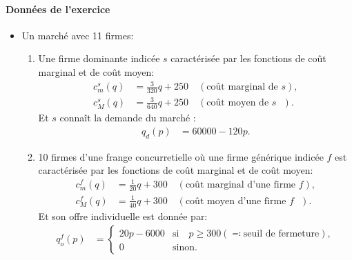 \documentclass[notes, ignorenonframetext, compress, 9pt, xcolor=svgnames, aspectratio=169]{beamer}
\begin{document}
\begin{frame}
  [allowframebreaks]{\insertsection}
  \framesubtitle{Données de l'exercice}
  \begin{itemize}
\item Un marché avec 11 firmes:
\begin{enumerate}[$\cdot$]
\item Une firme dominante indicée $s$ caractérisée par les fonctions de coût marginal et de coût moyen:
\begin{align}
c_m^s(q) &= \frac{3}{320}q + 250 \quad (\text{coût marginal de $s$}) \label{eq1},\\
c_M^s(q) &= \frac{3}{640}q + 250 \quad (\text{coût moyen de $s$ })\label{eq2}.
\end{align}
Et $s$ connaît la demande du marché :
\begin{align}
q_d(p) &= 60000 - 120p.\label{eq3}
\end{align}
\item 10 firmes d'une frange concurretielle où une firme générique indicée $f$ est caractérisée par les fonctions de coût marginal et de coût moyen:
\begin{align}
c_m^f (q)&= \frac{1}{20}q + 300 \quad (\text{coût marginal d'une firme $f$}) \label{eq4},\\
c_M^f(q) &= \frac{1}{40}q + 300 \quad (\text{coût moyen d'une firme  $f$ })\label{eq5}.
\end{align}
Et son offre individuelle est donnée par:
\begin{align}
q_o^f(p) &= \left\{
\begin{array}{ll}
20p-6000 & \text{si} \quad p\geq 300 (\eqqcolon \text{seuil de fermeture}), \\
0 & \text{sinon}.
\end{array}\right.
\label{eq6}
\end{align}
\end{enumerate}
\end{itemize}
\end{frame}
\end{document}
